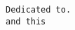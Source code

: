 \documentclass[a4paper,11pt]{book}
\begin{document}
\tt Dedicated to.
\\ and this

\frontmatter


\mainmatter


\backmatter
\end{document}
